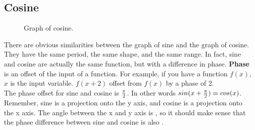 \clearpage
\subsection{Cosine}

\begin{figure}[htb]
\center
\caption{Graph of cosine.}
\label{fig:graph of cosine}
\end{figure}

There are obvious similarities between the graph of sine and the graph of cosine.  They have the same period, the same shape, and the same range.  In fact, sine and cosine are actually the same function, but with a difference in phase.  {\bf Phase} is an offset of the input of a function.  For example, if you have a function $f(x)$, $x$ is  the input variable.  $f(x+2)$ offset from $f(x)$ by a phase of $2$.\\

The phase offset for sine and cosine is $\frac{\pi}{2}$.  In other words $sin(x+\frac{\pi}{2}) = cos(x)$.  Remember, sine is a projection onto the y axis, and cosine is a projection onto the x axis.  The angle between the x and y axis is \pitwo, so it should make sense that the phase difference between sine and cosine is also \pitwo.

